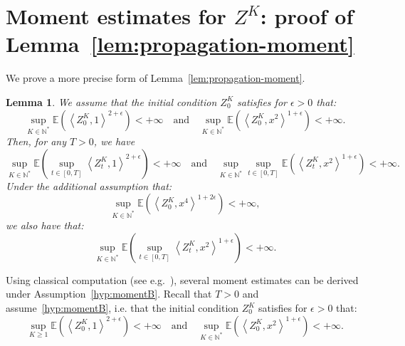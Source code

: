 \documentclass[10pt]{amsart}
\newtheorem{lemm}[theo]{Lemma}\newtheorem{prop}[theo]{Proposition}\newtheorem{coro}[theo]{Corollary}\newtheorem{conj}[theo]{Conjecture}
\theoremstyle{definition}\newtheorem{defi}[theo]{Definition}\newtheorem{rema}[theo]{Remark}\newtheorem{exam}[theo]{Example}\newtheorem{exem}[theo]{Example}\newtheorem{nota}[theo]{Notation}
\newcommand*\N{\mathbb{N}}
\newcommand*\E{\mathbb{E}}
\begin{document}
\section{Moment estimates for \texorpdfstring{$Z^{K}$}{ZK}: proof of Lemma~\ref{lem:propagation-moment}}\label{app:moment}

We prove a more precise form of Lemma~\ref{lem:propagation-moment}.

\begin{lemm}\label{lem:propagation-moment1}
We assume that the initial condition $Z^{K}_{0}$ satisfies for $\epsilon>0$ that:
\begin{equation}\label{hyp:momentB}
\sup_{K \in \N^*}\E\left(\left\langle Z^K_0,1\right\rangle^{2+\epsilon} \right)<+\infty\quad \text{and}\quad \sup_{K\in \N^*} \E\left(\left\langle Z^K_0,x^2\right\rangle^{1+\epsilon}\right)<+\infty.
\end{equation}
Then, for any $T>0$, we have
\begin{equation}
\sup_{K \in \N^*} \E\left(\sup_{t \in [0,T]}\left\langle Z^K_t,1\right\rangle^{2+\epsilon}\right)<+\infty\quad \text{and}\quad \sup_{K \in \N^*} \sup_{t \in [0, T]} \E\left(\left\langle Z^K_t,x^2\right\rangle^{1+\epsilon}\right)<+\infty.\label{eq:propagationB}
\end{equation}
Under the additional assumption that:
\begin{equation}\label{hyp:moment2B}
\sup_{K \in \N^*}\E\left(\left\langle Z^K_0,x^4\right\rangle^{1+2\epsilon}\right)<+\infty,
\end{equation}
we also have that:
\begin{equation}
\sup_{K \in \N^*} \E\left(\sup_{t \in [0, T]} \left\langle Z^K_t,x^2\right\rangle^{1+\epsilon}\right)<+\infty.\label{eq:propagation2B}
\end{equation}

\end{lemm}



Using classical computation (see e.g.~\cite{fourniermeleard}), several moment estimates can be derived under Assumption~\eqref{hyp:momentB}. Recall that $T>0$ and assume~\eqref{hyp:momentB}, i.e. that the initial condition $Z^{K}_{0}$ satisfies for $\epsilon>0$ that:
\begin{equation*}
\sup_{K \geq 1}\E\left(\left\langle Z^K_0,1\right\rangle^{2+\epsilon} \right)<+\infty\quad \text{and}\quad \sup_{K \in \N^*} \E\left(\left\langle Z^K_0,x^2\right\rangle^{1+\epsilon}\right)<+\infty.
\end{equation*}
\end{document}

